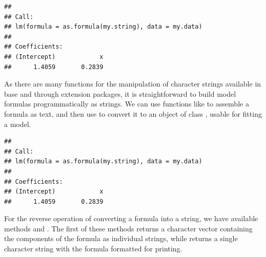 \documentclass[krantz2]{krantz}\usepackage{knitr}
\begin{document}
\begin{explainbox}
\begin{knitrout}\footnotesize
{}\color{fgcolor}\begin{kframe}
\begin{alltt}
 \hlkwb{<-} 
\hlstd{(}  
\end{alltt}
\begin{verbatim}
## 
## Call:
## lm(formula = as.formula(my.string), data = my.data)
## 
## Coefficients:
## (Intercept)            x  
##      1.4059       0.2839
\end{verbatim}
\end{kframe}
\end{knitrout}

As there are many functions for the manipulation of character strings available in base \Rlang and through extension packages, it is straightforward to build model formulas programmatically as strings. We can use functions like  to assemble a formula as text, and then use  to convert it to an object of class , usable for fitting a model.

\begin{knitrout}\footnotesize
{}\color{fgcolor}\begin{kframe}
\begin{alltt}
 \hlkwb{<-} \hlstd{(}\hlstd{,} \hlstd{,}  \hlstd{=} \hlstd{)}
\hlstd{(}  
\end{alltt}
\begin{verbatim}
## 
## Call:
## lm(formula = as.formula(my.string), data = my.data)
## 
## Coefficients:
## (Intercept)            x  
##      1.4059       0.2839
\end{verbatim}
\end{kframe}
\end{knitrout}

For the reverse operation of converting a formula into a string, we have available methods  and . The first of these methods returns a character vector containing the components of the formula as individual strings, while  returns a single character string with the formula formatted for printing.


\end{explainbox}
\end{document}
